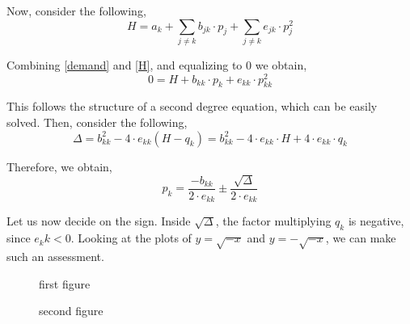 \documentclass[12pt]{article}
\begin{document}
Now, consider the following,
\begin{equation} \label{H}
H = a_k + \sum_{j \neq k} b_{jk} \cdot p_j + \sum_{j \neq k} e_{jk} \cdot p_j^2
\end{equation}

Combining \ref{demand} and \ref{H}, and equalizing to $0$ we obtain,
\begin{equation}
0 = H + b_{kk} \cdot p_k + e_{kk} \cdot p_{kk}^2
\end{equation}

This follows the structure of a second degree equation, which can be easily solved. Then, consider the following,
\begin{equation}
\Delta = b_{kk}^2 - 4 \cdot e_{kk} (H - q_k) = b_{kk}^2 - 4 \cdot e_{kk} \cdot H + 4 \cdot e_{kk} \cdot q_k 
\end{equation}

Therefore, we obtain,
\begin{equation}
p_k = \frac{-b_{kk}}{2 \cdot e_{kk}} \pm \frac{\sqrt{\Delta}}{2 \cdot e_{kk}}
\end{equation}

Let us now decide on the sign. Inside $\sqrt{\Delta}$, the factor multiplying $q_k$ is negative, since $e_kk < 0$. Looking at the plots of $y = \sqrt{-x}$ and $y = -\sqrt{-x}$, we can make such an assessment. \\

\begin{figure}
    \begin{minipage}{0.45\textwidth}
        \caption{first figure}
    \end{minipage}\hfill
    \begin{minipage}{0.45\textwidth}
\caption{second figure}
    \end{minipage}
\end{figure}
%
\end{document}
